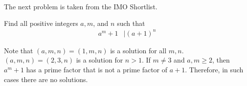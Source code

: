 		The next problem is taken from the IMO Shortlist.
	\begin{problem}
		Find all positive integers $a,m$, and $n$ such that
			\begin{align*}
				a^m+1 & \mid (a+1)^n
			\end{align*}
	\end{problem}

	\begin{solution}
		Note that $(a,m,n)=(1,m,n)$ is a solution for all $m,n$. $(a,m,n)=(2,3,n)$ is a solution for $n>1$. If $m\neq3$ and $a,m\geq2$, then $a^m+1$ has a prime factor that is not a prime factor of $a+1$. Therefore, in such cases there are no solutions.
	\end{solution}

